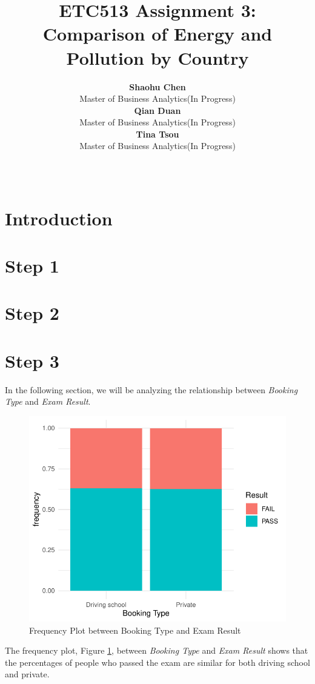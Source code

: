 \documentclass[11pt,a4paper,]{article}
\title{ETC513 Assignment 3: Comparison of Energy and Pollution by Country}
\author{\sf\Large\textbf{ Shaohu Chen}\\ {\sf\large Master of Business Analytics(In Progress)\\[0.5cm]} \sf\Large\textbf{ Qian Duan}\\ {\sf\large Master of Business Analytics(In Progress)\\[0.5cm]} \sf\Large\textbf{ Tina Tsou}\\ {\sf\large Master of Business Analytics(In Progress)\\[0.5cm]}}
\date{\sf\Date~\Month~\Year}
\makeatletter
\def\titlepage{\front{\expandafter{\@title}}{\@author}{\@organization}}
\makeatother
\begin{document}
\titlepage

\section*{Introduction}

\section*{Step 1}

\section*{Step 2}

\section*{Step 3}

In the following section, we will be analyzing the relationship between \emph{Booking Type} and \emph{Exam Result}.

\begin{figure}

{\centering \includegraphics{Assignment4_files/figure-latex/frequency-1} 

}

\caption{Frequency Plot between Booking Type and Exam Result}\label{fig:frequency}
\end{figure}

The frequency plot, Figure \ref{fig:frequency}, between \emph{Booking Type} and \emph{Exam Result} shows that the percentages of people who passed the exam are similar for both driving school and private.
\end{document}
